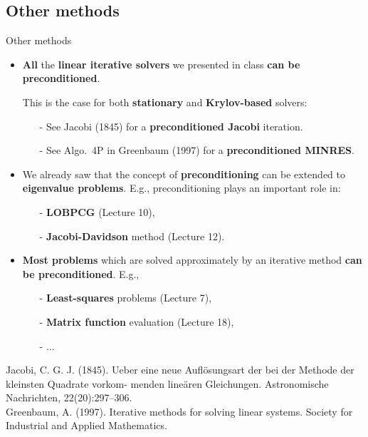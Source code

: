 \documentclass[t,usepdftitle=false]{beamer}
\begin{document}
\subsection{Other methods}
\begin{frame}{Other methods}
\begin{itemize}
\item \textbf{All} the \textbf{linear iterative solvers} we presented in class \textbf{can be preconditioned}.
\item[] This is the case for both \textbf{stationary} and \textbf{Krylov-based} solvers:
\begin{itemize}\normalsize
\item[-] See Jacobi (1845) for a \textbf{preconditioned Jacobi} iteration.
\item[-] See Algo.~4P in Greenbaum (1997) for a \textbf{preconditioned MINRES}.
\end{itemize}
\item We already saw that the concept of \textbf{preconditioning} can be extended to \textbf{eigenvalue problems}.
E.g., preconditioning plays an important role in:
\begin{itemize}\normalsize
\item[-] \textbf{LOBPCG} (Lecture 10),
\item[-] \textbf{Jacobi-Davidson} method (Lecture 12).
\end{itemize}
\item \textbf{Most problems} which are solved approximately by an iterative method \textbf{can be preconditioned}.
E.g., 
\begin{itemize}\normalsize
\item[-] \textbf{Least-squares} problems (Lecture 7), 
\item[-] \textbf{Matrix function} evaluation (Lecture 18),
\item[-] ...
\end{itemize}
\end{itemize}\smallskip
\tiny{Jacobi, C. G. J. (1845). Ueber eine neue Auflösungsart der bei der Methode der kleinsten Quadrate vorkom-
menden lineären Gleichungen. Astronomische Nachrichten, 22(20):297–306.}\tinyskip\\
\tiny{Greenbaum, A. (1997). Iterative methods for solving linear systems. Society for Industrial and Applied Mathematics.}
\end{frame}
\end{document}
